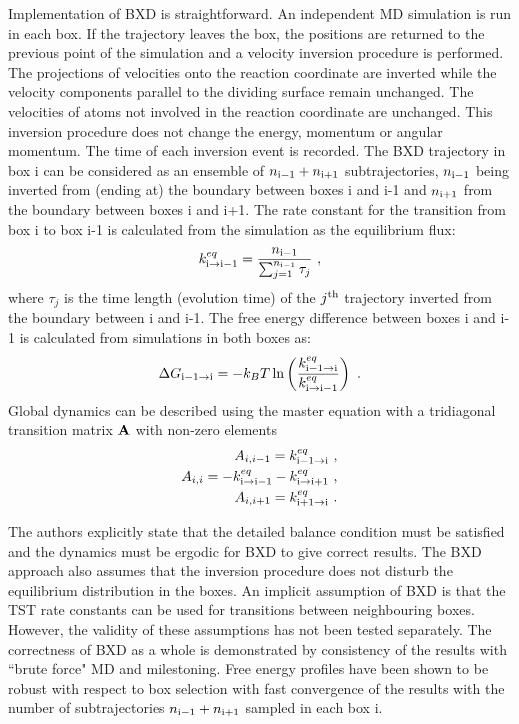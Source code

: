 Implementation of BXD is straightforward.
An independent MD simulation is run in each box.
If the trajectory leaves the box, the positions are returned to the previous point of the simulation and a velocity inversion procedure is performed.
The projections of velocities onto the reaction coordinate are inverted while the velocity components parallel to the dividing surface remain unchanged.
The velocities of atoms not involved in the reaction coordinate are unchanged.
This inversion procedure does not change the energy, momentum or angular momentum.
The time of each inversion event is recorded.
The BXD trajectory in box i can be considered as an ensemble of $n_{\rm i-1}+n_{\rm i+1}$ subtrajectories, $n_{\rm i-1}$ being inverted from (ending at) the boundary between boxes i and i-1 and $n_{\rm i+1}$ from the boundary between boxes i and i+1.
The rate constant for the transition from box i to box i-1 is calculated from the simulation as the equilibrium flux:
\begin{equation}
\label{eq:eq-flux-simul}
k^{eq}_{\rm i \rightarrow i-1} = \frac{n_{\rm i-1}}{\sum_{j=1}^{n_{\rm i-1}} \tau_j} ~,
\end{equation}
where $\tau_j$ is the time length (evolution time) of the $j^{\rm th}$ trajectory inverted from the boundary between i and i-1.
The free energy difference between boxes i and i-1 is calculated from simulations in both boxes as:
\begin{equation}
\label{eq:bxd-fe}
\Delta G_{\rm i-1 \rightarrow i} = - k_B T \ln \left( \frac{k^{eq}_{\rm i-1 \rightarrow i}}{k^{eq}_{\rm i \rightarrow i-1}} \right) ~.
\end{equation}
Global dynamics can be described using the master equation with a tridiagonal transition matrix ${\bf A}$ with non-zero elements
\begin{equation}
\label{eq:bxd-A}
\begin{split}
A_{i,i-1} = k^{eq}_{\rm i-1 \rightarrow i} ~,
\\
A_{i,i} = - k^{eq}_{\rm i \rightarrow i-1} - k^{eq}_{\rm i \rightarrow i+1} ~,
\\
A_{i,i+1} = k^{eq}_{\rm i+1 \rightarrow i} ~.
\end{split}
\end{equation}

The authors explicitly state that the detailed balance condition must be satisfied and the dynamics must be ergodic for BXD to give correct results.
The BXD approach also assumes that the inversion procedure does not disturb the equilibrium distribution in the boxes.
An implicit assumption of BXD is that the TST rate constants can be used for transitions between neighbouring boxes.
However, the validity of these assumptions has not been tested separately.
The correctness of BXD as a whole is demonstrated by consistency of the results with ``brute force" MD and milestoning.
Free energy profiles have been shown to be robust with respect to box selection with fast convergence of the results with the number of subtrajectories $n_{\rm i-1}+n_{\rm i+1}$ sampled in each box i.


